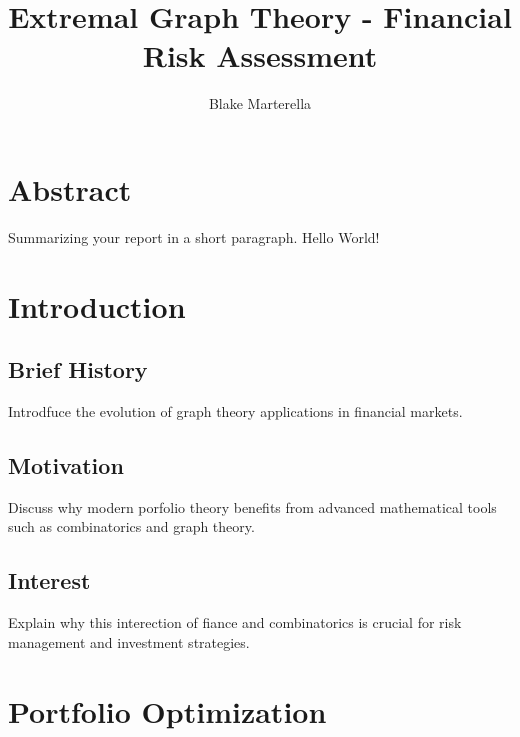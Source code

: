 \documentclass{article}
\begin{document}
\title{Extremal Graph Theory - Financial Risk Assessment}
\author{Blake Marterella}
\date{}

\maketitle

\section*{Abstract}
    Summarizing your report in a short paragraph.
    Hello World!

\tableofcontents

\section{Introduction}

\subsection{Brief History}

Introdfuce the evolution of graph theory applications in financial markets. 

\subsection{Motivation}

Discuss why modern porfolio theory benefits from advanced mathematical tools such as combinatorics and graph theory.

\subsection{Interest}

Explain why this interection of fiance and combinatorics is crucial for risk management and investment strategies.




\section{Portfolio Optimization}
\end{document}
